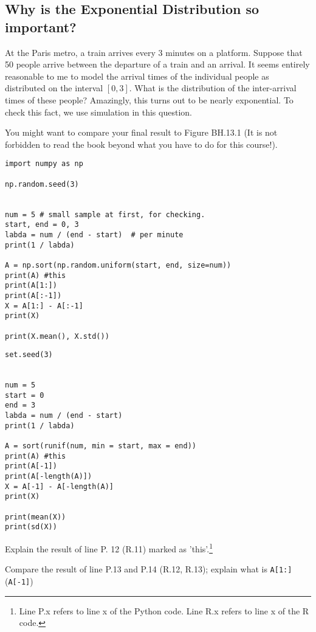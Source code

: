 

\subsection{Why is the Exponential Distribution so important?}

At the Paris metro, a train arrives every 3 minutes on a platform.
Suppose that 50 people arrive between the departure of a train and an arrival.
It seems entirely reasonable to me to model the arrival times of the individual people as distributed on the interval \([0,3]\).
What is the distribution of the inter-arrival times of these people? Amazingly, this turns out to be nearly exponential. To check this fact, we use simulation in this question.

You might want to compare your final result to Figure BH.13.1 (It is not forbidden to read the book beyond what you have to do for this course!).


\begin{verbatim}
import numpy as np

np.random.seed(3)


num = 5 # small sample at first, for checking.
start, end = 0, 3
labda = num / (end - start)  # per minute
print(1 / labda)

A = np.sort(np.random.uniform(start, end, size=num))
print(A) #this
print(A[1:])
print(A[:-1])
X = A[1:] - A[:-1]
print(X)

print(X.mean(), X.std())
\end{verbatim}


\begin{verbatim}
set.seed(3)


num = 5
start = 0
end = 3
labda = num / (end - start)
print(1 / labda)

A = sort(runif(num, min = start, max = end))
print(A) #this
print(A[-1])
print(A[-length(A)])
X = A[-1] - A[-length(A)]
print(X)

print(mean(X))
print(sd(X))
\end{verbatim}

\begin{exercise}
Explain the result of line P. 12 (R.11) marked as 'this'.\footnote{Line P.x refers to line x of the Python code.
  Line R.x refers to line x of the R code.}
\end{exercise}

\begin{exercise}
Compare the result of  line P.13 and P.14 (R.12, R.13);  explain what is \texttt{A[1:]} (\texttt{A[-1]})
\end{exercise}

